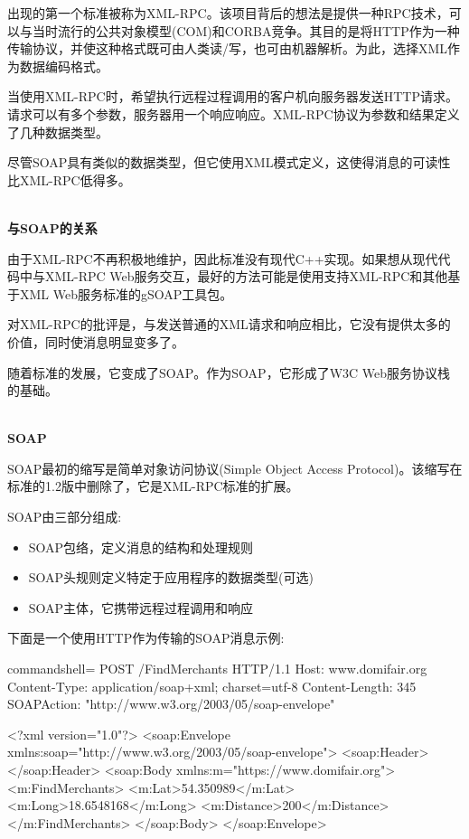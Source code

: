 出现的第一个标准被称为XML-RPC。该项目背后的想法是提供一种RPC技术，可以与当时流行的公共对象模型(COM)和CORBA竞争。其目的是将HTTP作为一种传输协议，并使这种格式既可由人类读/写，也可由机器解析。为此，选择XML作为数据编码格式。

当使用XML-RPC时，希望执行远程过程调用的客户机向服务器发送HTTP请求。请求可以有多个参数，服务器用一个响应响应。XML-RPC协议为参数和结果定义了几种数据类型。

尽管SOAP具有类似的数据类型，但它使用XML模式定义，这使得消息的可读性比XML-RPC低得多。

\hspace*{\fill} \\ %
\noindent
\textbf{与SOAP的关系}

由于XML-RPC不再积极地维护，因此标准没有现代C++实现。如果想从现代代码中与XML-RPC Web服务交互，最好的方法可能是使用支持XML-RPC和其他基于XML Web服务标准的gSOAP工具包。

对XML-RPC的批评是，与发送普通的XML请求和响应相比，它没有提供太多的价值，同时使消息明显变多了。

随着标准的发展，它变成了SOAP。作为SOAP，它形成了W3C Web服务协议栈的基础。

\hspace*{\fill} \\ %
\noindent
\textbf{SOAP}

SOAP最初的缩写是简单对象访问协议(Simple Object Access Protocol)。该缩写在标准的1.2版中删除了，它是XML-RPC标准的扩展。

SOAP由三部分组成:

\begin{itemize}
\item 
SOAP包络，定义消息的结构和处理规则

\item 
SOAP头规则定义特定于应用程序的数据类型(可选)

\item 
SOAP主体，它携带远程过程调用和响应
\end{itemize}

下面是一个使用HTTP作为传输的SOAP消息示例:

\begin{tcblisting}{commandshell={}}
POST /FindMerchants HTTP/1.1
Host: www.domifair.org
Content-Type: application/soap+xml; charset=utf-8
Content-Length: 345
SOAPAction: "http://www.w3.org/2003/05/soap-envelope"

<?xml version="1.0"?>
<soap:Envelope xmlns:soap="http://www.w3.org/2003/05/soap-envelope">
  <soap:Header>
  </soap:Header>
  <soap:Body xmlns:m="https://www.domifair.org">
    <m:FindMerchants>
      <m:Lat>54.350989</m:Lat>
      <m:Long>18.6548168</m:Long>
      <m:Distance>200</m:Distance>
    </m:FindMerchants>
  </soap:Body>
</soap:Envelope>
\end{tcblisting}

